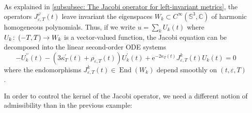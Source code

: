 \documentclass{article}
\numberwithin{equation}{section}        %
\theoremstyle{bfnote}
\theoremstyle{definition}
\theoremstyle{bfremark}
\newcommand{\col}{\colon \thinspace}        %
\newcommand{\C}{\mathbb{C}}                 %
\newcommand{\Sp}{\mathbb{S}}                %
\DeclareMathOperator{\End}{End}                 %
\begin{document}
As explained in \cref{subsubsec: The Jacobi operator for left-invariant metrics}, the operators $J^\varphi_{\varepsilon,T}(t)$ leave invariant the eigenspaces $W_k \subset C^\infty(\Sp^3,\C)$ of harmonic homogeneous polynomials. Thus, if we write $u = \sum_k U_k(t)$ where $U_k \col (-T,T) \rightarrow W_k$ is a vector-valued function, the Jacobi equation can be decomposed into the linear second-order ODE systems
\begin{equation*}
    -U^{\prime\prime}_k(t) - (3\kappa_T^\prime(t) + \rho_{\varepsilon,T}(t)) U^\prime_k(t) + \mathrm{e}^{-2\kappa_T(t)} J^k_{\varepsilon,T}(t)U_k(t) = 0
\end{equation*}
where the endomorphisms $J^k_{\varepsilon,T}(t) \in \End(W_k)$ depend smoothly on $(t,\varepsilon,T)$.  

In order to control the kernel of the Jacobi operator, we need a different notion of admissibility than in the previous example:
\end{document}
